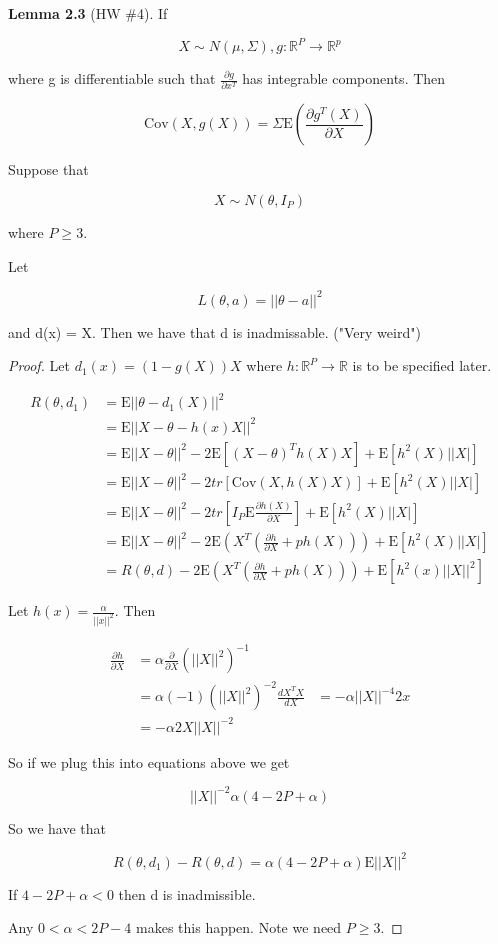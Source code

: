 \documentclass[11pt,fleqn]{book} %
\newcommand{\E}{\mathrm{E}}
\newcommand{\Cov}{\mathrm{Cov}}
\begin{document}
\textbf{Lemma 2.3} (HW \#4). If 

		$$X \sim N(\mu, \Sigma), g: \mathbb{R}^P \rightarrow \mathbb{R}^p $$

where g is differentiable such that $\frac{\partial g}{\partial x^T}$ has integrable components. Then 

		$$\Cov(X, g(X)) = \Sigma \E \left(\frac{\partial g^T(X)}{\partial X}\right) $$


\begin{theorem}[2.8]
	Suppose that 

			$$X \sim N(\theta, I_P) $$

	where $P \geq 3$. 

	Let 

			$$ L(\theta, a ) = ||\theta - a ||^2$$

	and d(x) = X. Then we have that d is inadmissable. ("Very weird")
\end{theorem}


\begin{proof}
	Let $d_1(x) = (1 - g(X)) X$ where $h: \mathbb{R}^P \rightarrow \mathbb{R}$ is to be specified later. 

		\begin{align*}
			R(\theta, d_1) &= \E ||\theta - d_1(X)||^2 \\
				&= \E ||X - \theta - h(x) X ||^2\\
				&= \E||X - \theta||^2 - 2\E [(X- \theta)^T h(X)X] + \E [h^2(X) ||X|]\\
				&= \E||X - \theta||^2 - 2 tr[\Cov(X, h(X)X)] + \E [h^2(X) ||X|]\\
				&= \E||X - \theta||^2 - 2 tr [I_P \E \frac{\partial h(X)}{\partial X}] + \E [h^2(X) ||X|]\\
				&=\E||X - \theta||^2 - 2\E(X^T (\frac{\partial h}{\partial X} + ph(X))) + \E [h^2(X) ||X|]\\
				&=R(\theta, d) -  2\E(X^T (\frac{\partial h}{\partial X} + ph(X))) + \E [h^2 (x) ||X||^2]
		\end{align*}

Let $h(x) = \frac{\alpha}{||x||^2}$. Then 

		\begin{align}
			\frac{\partial h}{\partial X} &= \alpha \frac{\partial}{\partial X} (||X||^2)^{-1} \\
				&=\alpha(-1)(||X||^2)^{-2} \frac{d X^T X}{d X}
				&= -\alpha ||X||^{-4} 2x\\
				&= -\alpha 2X ||X||^{-2}
		\end{align}


So if we plug this into equations above we get 

		$$||X||^{-2} \alpha(4 - 2P + \alpha) $$

So we have that

		$$R(\theta, d_1) - R(\theta, d) = \alpha(4 - 2 P + \alpha ) \E ||X||^2 $$

If $4 - 2 P + \alpha < 0$ then d is inadmissible.

Any $0 < \alpha < 2P - 4$ makes this happen. Note we need $P \geq 3$. 
\end{proof}
\end{document}
